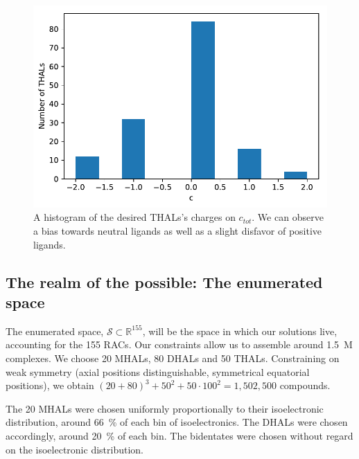 \begin{figure}[]{}
	\centering	
	\includegraphics[width=.9\linewidth]{img/thal_ss_hist_charge.pdf} 
	\caption{A histogram of the desired THALs's charges on $c_{tot}$. We can observe a bias towards neutral ligands as well as a slight disfavor of positive ligands.} 
	\label{fig:thalhist_charge}
\end{figure}

\subsection{The realm of the possible: The enumerated space}
The enumerated space, $\mathcal{S} \subset \mathbb{R}^{155}$, will be the space in which our solutions live, accounting for the 155 RACs. Our constraints allow us to assemble around 1.5~M complexes. We choose 20 MHALs, 80 DHALs and 50 THALs. Constraining on weak symmetry (axial positions distinguishable, symmetrical equatorial positions), we obtain $(20 + 80)^3 + 50^2 + 50 \cdot 100^2 = 1,502,500$ compounds. 

The 20 MHALs were chosen uniformly proportionally to their isoelectronic distribution, around 66~\% of each bin of isoelectronics. The DHALs were chosen accordingly, around 20~\% of each bin. The bidentates were chosen without regard on the isoelectronic distribution.

\newpage 